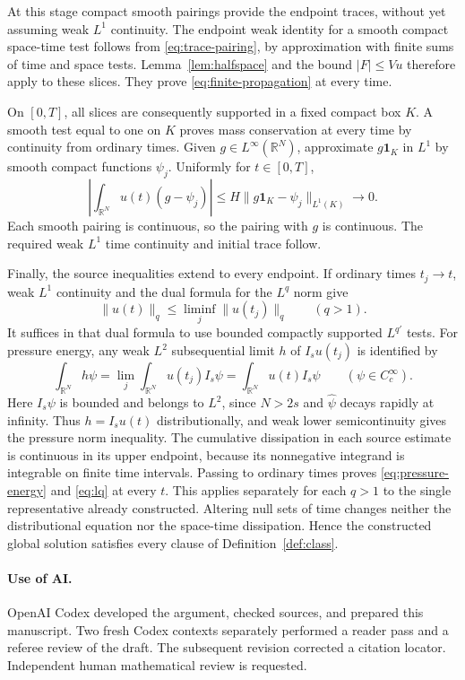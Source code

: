 \documentclass[11pt]{article}
\theoremstyle{definition}
\newcommand{\R}{\mathbb R}
\begin{document}
At this stage compact smooth pairings provide the endpoint traces, without yet assuming weak $L^1$ continuity. The endpoint weak identity for a smooth compact space-time test follows from \eqref{eq:trace-pairing}, by approximation with finite sums of time and space tests. Lemma~\ref{lem:halfspace} and the bound $|F|\le Vu$ therefore apply to these slices. They prove \eqref{eq:finite-propagation} at every time.

On $[0,T]$, all slices are consequently supported in a fixed compact box $K$. A smooth test equal to one on $K$ proves mass conservation at every time by continuity from ordinary times. Given $g\in L^\infty(\R^N)$, approximate $g\mathbf1_K$ in $L^1$ by smooth compact functions $\psi_j$. Uniformly for $t\in[0,T]$,
\[
 \left|\int_{\R^N}u(t)(g-\psi_j)\right|
 \le H\|g\mathbf1_K-\psi_j\|_{L^1(K)}\longrightarrow0.
\]
Each smooth pairing is continuous, so the pairing with $g$ is continuous. The required weak $L^1$ time continuity and initial trace follow.

Finally, the source inequalities extend to every endpoint. If ordinary times $t_j\to t$, weak $L^1$ continuity and the dual formula for the $L^q$ norm give
\[
 \|u(t)\|_q\le\liminf_j\|u(t_j)\|_q\qquad(q>1).
\]
It suffices in that dual formula to use bounded compactly supported $L^{q'}$ tests. For pressure energy, any weak $L^2$ subsequential limit $h$ of $I_su(t_j)$ is identified by
\[
 \int_{\R^N}h\psi
 =\lim_j\int_{\R^N}u(t_j)I_s\psi
 =\int_{\R^N}u(t)I_s\psi
 \qquad(\psi\in C_c^\infty).
\]
Here $I_s\psi$ is bounded and belongs to $L^2$, since $N>2s$ and $\widehat\psi$ decays rapidly at infinity. Thus $h=I_su(t)$ distributionally, and weak lower semicontinuity gives the pressure norm inequality. The cumulative dissipation in each source estimate is continuous in its upper endpoint, because its nonnegative integrand is integrable on finite time intervals. Passing to ordinary times proves \eqref{eq:pressure-energy} and \eqref{eq:lq} at every $t$. This applies separately for each $q>1$ to the single representative already constructed. Altering null sets of time changes neither the distributional equation nor the space-time dissipation. Hence the constructed global solution satisfies every clause of Definition~\ref{def:class}.

\paragraph{Use of AI.}
OpenAI Codex developed the argument, checked sources, and prepared this manuscript. Two fresh Codex contexts separately performed a reader pass and a referee review of the draft. The subsequent revision corrected a citation locator. Independent human mathematical review is requested.
\end{document}
